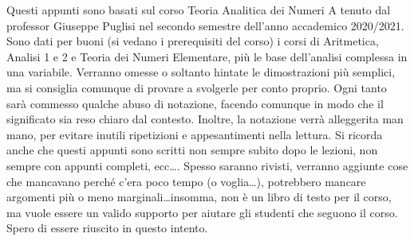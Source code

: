Questi appunti sono basati sul corso Teoria Analitica dei Numeri A tenuto dal professor Giuseppe Puglisi nel secondo semestre dell'anno accademico 2020/2021. Sono dati per buoni (si vedano i prerequisiti del corso) i corsi di Aritmetica, Analisi 1 e 2 e Teoria dei Numeri Elementare, più le base dell'analisi complessa in una variabile. Verranno omesse o soltanto hintate le dimostrazioni più semplici, ma si consiglia comunque di provare a svolgerle per conto proprio. Ogni tanto sarà commesso qualche abuso di notazione, facendo comunque in modo che il significato sia reso chiaro dal contesto. Inoltre, la notazione verrà alleggerita man mano, per evitare inutili ripetizioni e appesantimenti nella lettura. Si ricorda anche che questi appunti sono scritti non sempre subito dopo le lezioni, non sempre con appunti completi, ecc\dots. Spesso saranno rivisti, verranno aggiunte cose che mancavano perché c'era poco tempo (o voglia\dots), potrebbero mancare argomenti più o meno marginali\dots insomma, non è un libro di testo per il corso, ma vuole essere un valido supporto per aiutare gli studenti che seguono il corso. Spero di essere riuscito in questo intento.
